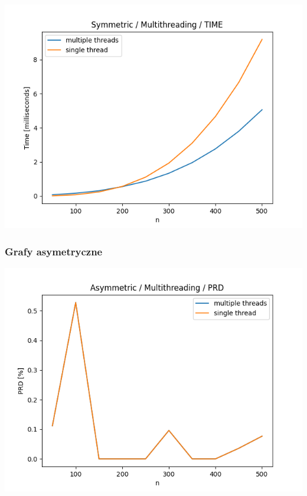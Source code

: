 \documentclass{article}
\begin{document}
\begin{center}
\includegraphics[width=\textwidth, 
                   height = 0.4\textheight, 
                   keepaspectratio]
                  {plots/multithreading_symmetric_time} 
\end{center}

\subsubsection{Grafy asymetryczne}

\begin{center}
\includegraphics[width=\textwidth, 
                   height = 0.4\textheight, 
                   keepaspectratio]
                  {plots/multithreading_asymmetric_prd} 
\end{center}
\end{document}
